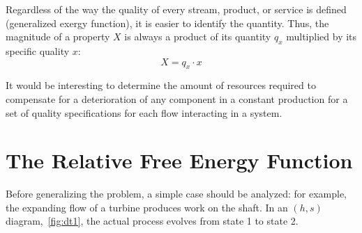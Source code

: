\documentclass[energies,article,submit,moreauthors,pdftex]{Definitions/mdpi}
\begin{document}
Regardless of the way the quality of every stream, product, or service is defined (generalized exergy function), it is easier to identify the quantity. Thus, the magnitude of a property $X$ is always a product of its quantity $q_x$ multiplied by its specific quality $x$:
\begin{equation}
X=q_x\cdot x
\end{equation}                      

It would be interesting to determine the amount of resources required to compensate for a deterioration of any component in a constant production for a set of quality specifications for each flow interacting in a system.

\section{The Relative Free Energy Function}
Before generalizing the problem, a simple case should be analyzed: for example, the expanding flow of a turbine produces work on the shaft. In an $(h, s)$ diagram,~\cref{fig:dt1}, the actual process evolves from state 1 to state 2. 
\end{document}
